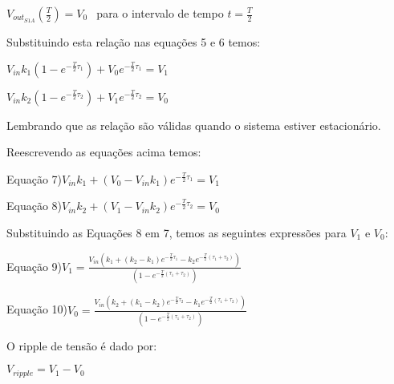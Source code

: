 \documentclass{article}
\begin{document}
$V_{out_{S1A}}\left( \frac{T}{2}\right) =V_{0\text{ }}$ para o intervalo de
tempo $t=\frac{T}{2}$

Substituindo esta rela\c{c}\~{a}o nas equa\c{c}\~{o}es 5 e 6 temos:

\vspace{1pt}

$V_{in}k_{1}\left( 1-e^{-\frac{T}{2}\tau _{1}}\right) +V_{0}e^{-\frac{T}{2}%
\tau _{1}}=V_{1\text{ }}$

$V_{in}k_{2}\left( 1-e^{-\frac{T}{2}\tau _{2}}\right) +V_{1}e^{-\frac{T}{2}%
\tau _{2}}=V_{0\text{ }}$

\vspace{1pt}

Lembrando que as rela\c{c}\~{a}o s\~{a}o v\'{a}lidas quando o sistema
estiver estacion\'{a}rio.

Reescrevendo as equa\c{c}\~{o}es acima temos:

Equa\c{c}\~{a}o 7)\qquad $V_{in}k_{1}+\left( V_{0}-V_{in}k_{1}\right) e^{-%
\frac{T}{2}\tau _{1}}=V_{1\text{ }}$

\qquad \qquad \qquad

Equa\c{c}\~{a}o 8)\qquad $V_{in}k_{2}+\left( V_{1}-V_{in}k_{2}\right) e^{-%
\frac{T}{2}\tau _{2}}=V_{0\text{ }}$

\vspace{1pt}

Substituindo as Equa\c{c}\~{o}es 8 em 7, temos as seguintes express\~{o}es
para $V_{1}$ e $V_{0}$:

\vspace{1pt}

Equa\c{c}\~{a}o 9)\qquad $V_{1}=\frac{V_{in}\left( k_{1}+\left(
k_{2}-k_{1}\right) e^{-\frac{T}{2}\tau _{1}}-k_{2}e^{-\frac{T}{2}\left( \tau
_{1}+\tau _{2}\right) }\right) }{\left( 1-e^{-\frac{T}{2}\left( \tau
_{1}+\tau _{2}\right) }\right) }$

\vspace{1pt}

Equa\c{c}\~{a}o 10)\qquad $V_{0}=\frac{V_{in}\left( k_{2}+\left(
k_{1}-k_{2}\right) e^{-\frac{T}{2}\tau _{2}}-k_{1}e^{-\frac{T}{2}\left( \tau
_{1}+\tau _{2}\right) }\right) }{\left( 1-e^{-\frac{T}{2}\left( \tau
_{1}+\tau _{2}\right) }\right) }$

\vspace{1pt}

O ripple de tens\~{a}o \'{e} dado por:

\vspace{1pt}

$V_{ripple}=V_{1}-V_{0}$
\end{document}
